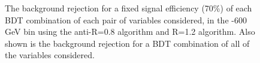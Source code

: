 \begin{figure}
\begin{center}
\caption{The background rejection
for a fixed signal efficiency (70\%) of each BDT combination of
each pair of variables considered, in the -600 GeV bin using the anti-\kT R=0.8
algorithm and R=1.2 algorithm. Also shown is the background rejection
for a BDT combination of all of the variables considered.}
\label{fig:pt500_comb2D}
\end{center}
\end{figure}

